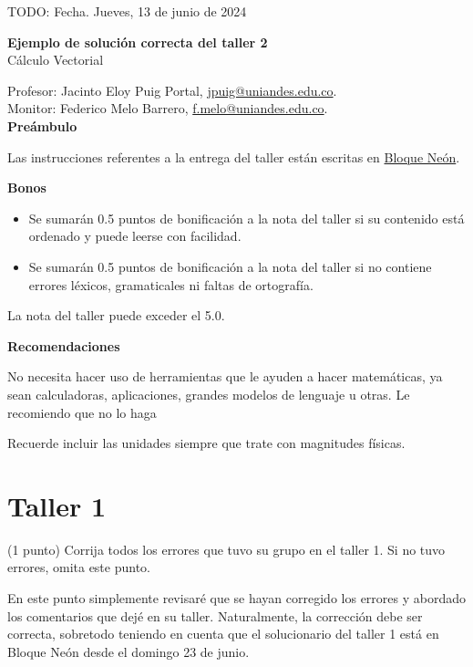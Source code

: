 \documentclass{fmbvecto}
\renewcommand{\title}{Ejemplo de solución correcta del taller 2}
\newcommand{\subject}{Cálculo Vectorial}
\begin{document}
TODO: Fecha. Jueves, 13 de junio de 2024

\begin{center}
    \textbf{\LARGE \title} \\
    {\large \subject}
\end{center}


Profesor: Jacinto Eloy Puig Portal, \href{mailto:jpuig@uniandes.edu.co}{jpuig@uniandes.edu.co}. \\
Monitor: Federico Melo Barrero, \href{mailto:f.melo@uniandes.edu.co}{f.melo@uniandes.edu.co}.\\

\textbf{\Large Preámbulo}

Las instrucciones referentes a la entrega del taller están escritas en \href{https://bloqueneon.uniandes.edu.co/d2l/home}{Bloque Neón}.

\textbf{Bonos}
\begin{itemize}
  \item Se sumarán 0.5 puntos de bonificación a la nota del taller si su contenido está ordenado y puede leerse con facilidad.
  \item Se sumarán 0.5 puntos de bonificación a la nota del taller si no contiene errores léxicos, gramaticales ni faltas de ortografía.
\end{itemize}
La nota del taller puede exceder el 5.0.

\textbf{Recomendaciones}

No necesita hacer uso de herramientas que le ayuden a hacer matemáticas, ya sean calculadoras, aplicaciones, grandes modelos de lenguaje u otras. Le recomiendo que no lo haga

Recuerde incluir las unidades siempre que trate con magnitudes físicas.

\section{Taller 1}

\begin{problema}
    
    (1 punto) Corrija todos los errores que tuvo su grupo en el taller 1. Si no tuvo errores, omita este punto.

    \tcblower
    
    En este punto simplemente revisaré que se hayan corregido los errores y abordado los comentarios que dejé en su taller. Naturalmente, la corrección debe ser correcta, sobretodo teniendo en cuenta que el solucionario del taller 1 está en Bloque Neón desde el domingo 23 de junio.

\end{problema}
\end{document}

